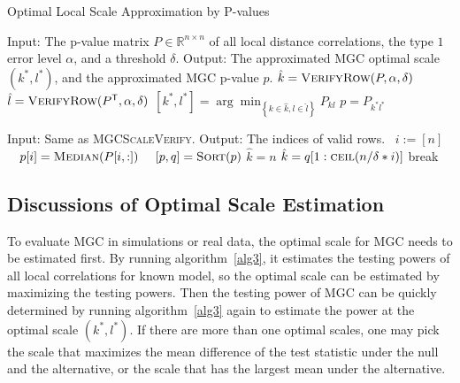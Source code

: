 \documentclass[11pt]{article}
\newcommand{\Real}{\mathbb{R}}
\newcommand{\T}{^{\ensuremath{\mathsf{T}}}}           %
\newcommand{\Linefor}[2]{%
    \State \algorithmicfor\ {#1}\ \algorithmicdo\ {#2} \algorithmicend\ \algorithmicfor%
}
\begin{document}
\begin{algorithm}
\caption{Optimal Local Scale Approximation by P-values}
\label{alg5}
\begin{algorithmic}[1]
\Statex Input: The p-value matrix $P \in \Real^{n \times n}$ of all local distance correlations, the type $1$ error level $\alpha$, and a threshold $\delta$.
\Statex Output: The approximated MGC optimal scale $(k^{*},l^{*})$, and the approximated MGC p-value $p$.
\State $\hat{k}=\textsc{VerifyRow}(P,\alpha,\delta)$ 
\State $\hat{l}=\textsc{VerifyRow}(P\T,\alpha,\delta)$ 
\State $[k^{*},l^{*}]=\arg\min_{\left\{k \in \hat{k}, l \in \hat{l}\right\}} P_{kl}$ 
\State $p=P_{k^{*}l^{*}}$
\EndFunction
\end{algorithmic}

\begin{algorithmic}[1]
\Statex
\Statex Input: Same as \textsc{MGCScaleVerify}.
\Statex Output: The indices of valid rows.
\Linefor{$i:=[n]$}{$p[i]= \textsc{Median}(P[i,:])$} 
\State $[p,q]=\textsc{Sort}(p)$ 
\State $\hat{k}=n$ 
\State $\hat{k}=q[1:\textsc{ceil}(n/\delta*i)]$
\State break 
\EndIf
\EndFor
\EndFunction
\end{algorithmic}
\end{algorithm}

\subsection{Discussions of Optimal Scale Estimation}
\label{appen:diss}
To evaluate MGC in simulations or real data, the optimal scale for MGC needs to be estimated first. By running algorithm~\ref{alg3}, it estimates the testing powers of all local correlations for known model, so the optimal scale can be estimated by maximizing the testing powers. Then the testing power of MGC can be quickly determined by running algorithm~\ref{alg3} again to estimate the power at the optimal scale $(k^{*},l^{*})$. If there are more than one optimal scales, one may pick the scale that maximizes the mean difference of the test statistic under the null and the alternative, or the scale that has the largest mean under the alternative. 
\end{document}
